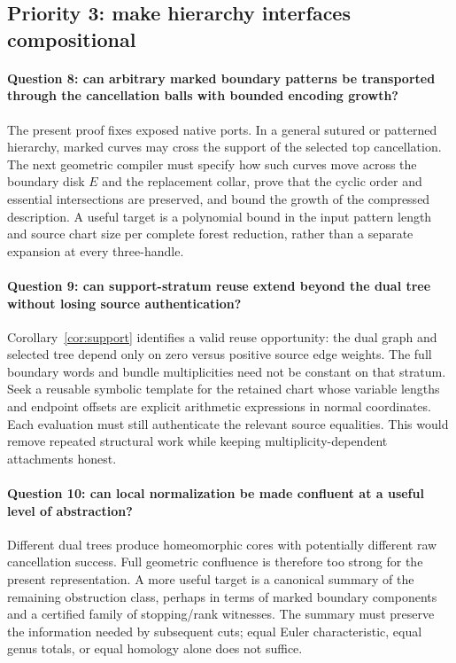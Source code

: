 \subsection{Priority 3: make hierarchy interfaces compositional}
\paragraph{Question 8: can arbitrary marked boundary patterns be transported
through the cancellation balls with bounded encoding growth?}
The present proof fixes exposed native ports.  In a general sutured or
patterned hierarchy, marked curves may cross the support of the selected
top cancellation.  The next geometric compiler must specify how such
curves move across the boundary disk $E$ and the replacement collar,
prove that the cyclic order and essential intersections are preserved,
and bound the growth of the compressed description.  A useful target is
a polynomial bound in the input pattern length and source chart size
per complete forest reduction, rather than a separate expansion at every
three-handle.

\paragraph{Question 9: can support-stratum reuse extend beyond the dual
tree without losing source authentication?}
Corollary~\ref{cor:support} identifies a valid reuse opportunity: the
dual graph and selected tree depend only on zero versus positive source
edge weights.  The full boundary words and bundle multiplicities need
not be constant on that stratum.  Seek a reusable symbolic template for
the retained chart whose variable lengths and endpoint offsets are
explicit arithmetic expressions in normal coordinates.  Each evaluation
must still authenticate the relevant source equalities.  This would
remove repeated structural work while keeping multiplicity-dependent
attachments honest.

\paragraph{Question 10: can local normalization be made confluent at a
useful level of abstraction?}
Different dual trees produce homeomorphic cores with potentially different
raw cancellation success.  Full geometric confluence is therefore too
strong for the present representation.  A more useful target is a canonical
summary of the remaining obstruction class, perhaps in terms of marked
boundary components and a certified family of stopping/rank witnesses.
The summary must preserve the information needed by subsequent cuts;
equal Euler characteristic, equal genus totals, or equal homology alone
does not suffice.

